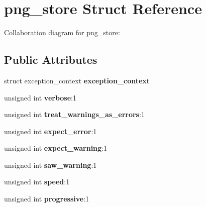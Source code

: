 \hypertarget{structpng__store}{\section{png\+\_\+store Struct Reference}
\label{structpng__store}
}


Collaboration diagram for png\+\_\+store\+:
\subsection*{Public Attributes}
\begin{DoxyCompactItemize}
\item 
\hypertarget{structpng__store_a6a1cab9cc58992ba05ba7766acf1cd51}{struct exception\+\_\+context {\bfseries exception\+\_\+context}}\label{structpng__store_a6a1cab9cc58992ba05ba7766acf1cd51}

\item 
\hypertarget{structpng__store_ad1f24e35adef041ebda5d4533fb7c9ba}{unsigned int {\bfseries verbose}\+:1}\label{structpng__store_ad1f24e35adef041ebda5d4533fb7c9ba}

\item 
\hypertarget{structpng__store_a43fb1b6670fbd8806fdd3e69300e0ff2}{unsigned int {\bfseries treat\+\_\+warnings\+\_\+as\+\_\+errors}\+:1}\label{structpng__store_a43fb1b6670fbd8806fdd3e69300e0ff2}

\item 
\hypertarget{structpng__store_aac3ebe7b9824d4f2883b9325553172d0}{unsigned int {\bfseries expect\+\_\+error}\+:1}\label{structpng__store_aac3ebe7b9824d4f2883b9325553172d0}

\item 
\hypertarget{structpng__store_acc645912f715862887aff6a9124fccdd}{unsigned int {\bfseries expect\+\_\+warning}\+:1}\label{structpng__store_acc645912f715862887aff6a9124fccdd}

\item 
\hypertarget{structpng__store_ac4aa0663dc750ce54650ba91e5a2a20b}{unsigned int {\bfseries saw\+\_\+warning}\+:1}\label{structpng__store_ac4aa0663dc750ce54650ba91e5a2a20b}

\item 
\hypertarget{structpng__store_a9942c50b009b1c55c19f7c4490fb9071}{unsigned int {\bfseries speed}\+:1}\label{structpng__store_a9942c50b009b1c55c19f7c4490fb9071}

\item 
\hypertarget{structpng__store_a107cfef0a41bd8b8e7ebb7f072c9676c}{unsigned int {\bfseries progressive}\+:1}\label{structpng__store_a107cfef0a41bd8b8e7ebb7f072c9676c}


\end{DoxyCompactItemize}
